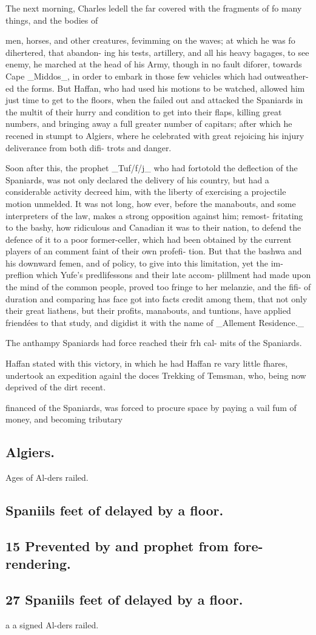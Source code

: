 The next morning, Charles ledell the far covered with the fragments of fo many things, and the bodies of\par\medskip
men, horses, and other creatures, fevimming on the waves; at which he was fo dihertered, that abandon- ing his tests, artillery, and all his heavy bagages, to see enemy, he marched at the head of his Army, though in no fault diforer, towards Cape \_Middos\_, in order to embark in those few vehicles which had outweather- ed the forms. But Haffan, who had used his motions to be watched, allowed him just time to get to the floors, when the failed out and attacked the Spaniards in the multit of their hurry and condition to get into their flaps, killing great numbers, and bringing away a full greater number of capitars; after which he recened in stumpt to Algiers, where he celebrated with great rejoicing his injury deliverance from both difi- trots and danger.\par\medskip
Soon after this, the prophet \_Tuf/f/j\_ who had fortotold the deflection of the Spaniards, was not only declared the delivery of his country, but had a considerable activity decreed him, with the liberty of exercising a projectile motion unmelded. It was not long, how ever, before the manabouts, and some interpreters of the law, makes a strong opposition against him; remost- fritating to the bashy, how ridiculous and Canadian it was to their nation, to defend the defence of it to a poor former-celler, which had been obtained by the current players of an comment faint of their own profefi- tion. But that the bashwa and his downward femen, and of policy, to give into this limitation, yet the im- preflion which Yufe’s predlifessons and their late accom- plillment had made upon the mind of the common people, proved too fringe to her melanzie, and the fifi- of duration and comparing has face got into facts credit among them, that not only their great liathens, but their profits, manabouts, and tuntions, have applied friendées to that study, and digidist it with the name of \_Allement Residence.\_\par\medskip
The anthampy Spaniards had force reached their frh cal- mits of the Spaniards.\par\medskip
Haffan stated with this victory, in which he had Haffan re vary little fhares, undertook an expedition againl the doces Trekking of Temsman, who, being now deprived of the dirt recent.\par\medskip
financed of the Spaniards, was forced to procure space by paying a vail fum of money, and becoming tributary\par\medskip
\subsection*{Algiers.}
Ages of Al-ders railed.\par\medskip
\subsection*{Spaniils feet of delayed by a floor.}
\subsection*{15 Prevented by and prophet from fore- rendering.}
\subsection*{27 Spaniils feet of delayed by a floor.}
a a signed Al-ders railed.\par\medskip
